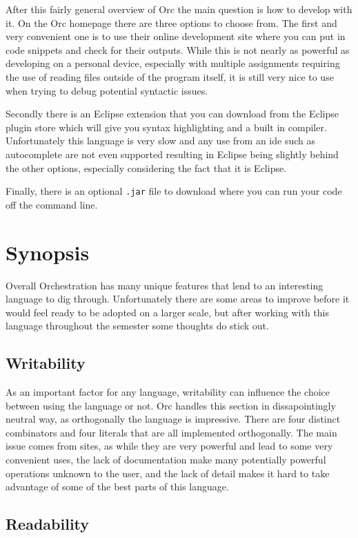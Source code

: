 \documentclass[12pt, letterpaper]{article}
\begin{document}
After this fairly general overview of Orc the main question is how to develop with it.  On the Orc homepage there are three options to choose from.  The first and very convenient one is to use their online development site where you can put in code snippets and check for their outputs.  While this is not nearly as powerful as developing on a personal device, especially with multiple assignments requiring the use of reading files outside of the program itself, it is still very nice to use when trying to debug potential syntactic issues.

Secondly there is an Eclipse extension that you can download from the Eclipse plugin store which will give you syntax highlighting and a built in compiler.  Unfortunately this language is very slow and any use from an ide such as autocomplete are not even supported resulting in Eclipse being slightly behind the other options, especially considering the fact that it is Eclipse.

Finally, there is an optional \texttt{.jar} file to download where you can run your code off the command line.

\section{Synopsis}

Overall Orchestration has many unique features that lend to an interesting language to dig through.  Unfortunately there are some areas to improve before it would feel ready to be adopted on a larger scale, but after working with this language throughout the semester some thoughts do stick out.

\subsection{Writability}

As an important factor for any language, writability can influence the choice between using the language or not.  Orc handles this section in dissapointingly neutral way, as orthogonally the language is impressive.  There are four distinct combinators and four literals that are all implemented orthogonally.  The main issue comes from sites, as while they are very powerful and lead to some very convenient uses, the lack of documentation make many potentially powerful operations unknown to the user, and the lack of detail makes it hard to take advantage of some of the best parts of this language.

\subsection{Readability}
\end{document}
